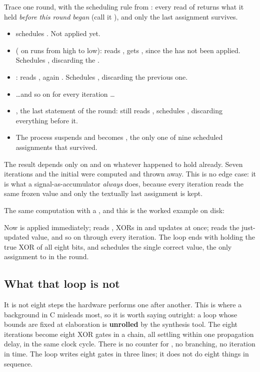 Trace one round, with the scheduling rule from : every read of
 returns what it held \emph{before this round began} (call it ),
and only the last assignment survives.
\begin{itemize}
  \item {} schedules . Not applied yet.
  \item {} ( on  runs from high to low): reads
    , gets , since the  has not been applied. Schedules
    , discarding the .
  \item {}: reads , again . Schedules
    , discarding the previous one.
  \item \dots and so on for every iteration \dots
  \item {}, the last statement of the round: still reads , schedules
    , discarding everything before it.
  \item The process suspends and  becomes , the only one
    of nine scheduled assignments that survived.
\end{itemize}

The result depends only on  and on whatever  happened to hold already.
Seven iterations and the initial  were computed and thrown away. This is no edge case: it
is what a signal-as-accumulator \emph{always} does, because every iteration reads the same frozen
value and only the textually last assignment is kept.

The same computation with a , and this is the worked example on disk:


Now  is applied immediately;  reads , XORs in 
and updates  at once;  reads the just-updated value, and so on through every
iteration. The loop ends with  holding the true XOR of all eight bits, and
 schedules the single correct value, the only assignment to 
in the round.

\subsection*{What that loop is not}
It is not eight steps the hardware performs one after another. This is where a background in C
misleads most, so it is worth saying outright: a  loop whose bounds are fixed at
elaboration is \textbf{unrolled} by the synthesis tool. The eight iterations become eight XOR gates
in a chain, all settling within one propagation delay, in the same clock cycle. There is no counter
for , no branching, no iteration in time. The loop writes eight gates in three lines; it
does not do eight things in sequence.

